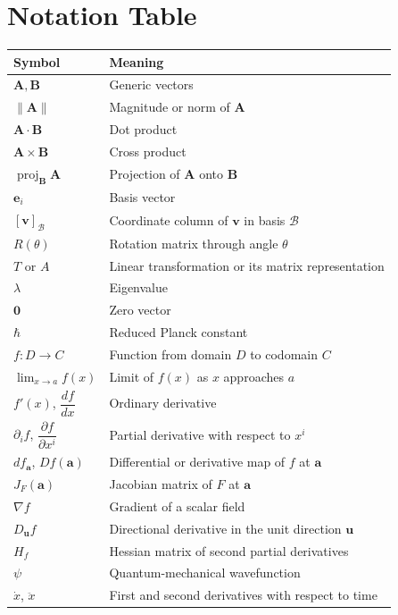 \chapter*{Notation Table}
\begin{longtable}{@{}p{}p{}@{}}
\toprule
Symbol & Meaning\\
\midrule
\endhead
$\mathbf A,\mathbf B$ & Generic vectors\\
$\lVert\mathbf A\rVert$ & Magnitude or norm of $\mathbf A$\\
$\mathbf A\cdot\mathbf B$ & Dot product\\
$\mathbf A\times\mathbf B$ & Cross product\\
$\operatorname{proj}_{\mathbf B}\mathbf A$ & Projection of $\mathbf A$ onto $\mathbf B$\\
$\mathbf e_i$ & Basis vector\\
$[\mathbf v]_{\mathcal B}$ & Coordinate column of $\mathbf v$ in basis $\mathcal B$\\
$R(\theta)$ & Rotation matrix through angle $\theta$\\
$T$ or $A$ & Linear transformation or its matrix representation\\
$\lambda$ & Eigenvalue\\
$\mathbf0$ & Zero vector\\
$\hbar$ & Reduced Planck constant\\
$f:D\to C$ & Function from domain $D$ to codomain $C$\\
$\displaystyle \lim_{x\to a}f(x)$ & Limit of $f(x)$ as $x$ approaches $a$\\
$f'(x)$, $\dfrac{df}{dx}$ & Ordinary derivative\\
$\partial_i f$, $\dfrac{\partial f}{\partial x^i}$ & Partial derivative with respect to $x^i$\\
$df_{\mathbf a}$, $Df(\mathbf a)$ & Differential or derivative map of $f$ at $\mathbf a$\\
$J_F(\mathbf a)$ & Jacobian matrix of $F$ at $\mathbf a$\\
$\nabla f$ & Gradient of a scalar field\\
$D_{\mathbf u}f$ & Directional derivative in the unit direction $\mathbf u$\\
$H_f$ & Hessian matrix of second partial derivatives\\
$\psi$ & Quantum-mechanical wavefunction\\
$\dot{x}$, $\ddot{x}$ & First and second derivatives with respect to time\\

\end{longtable}
